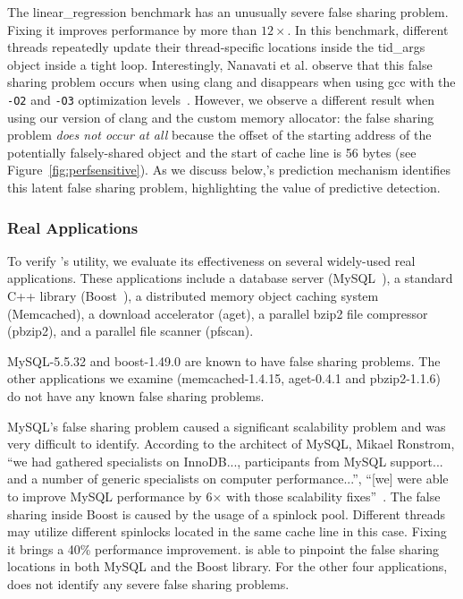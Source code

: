 The linear\_regression benchmark has an unusually severe false sharing problem. Fixing it improves performance by more than $12\times$. In this benchmark, different threads repeatedly update their thread-specific locations inside the tid\_args object inside a tight loop. Interestingly, Nanavati et al. observe that this false sharing problem occurs when using clang and disappears when using gcc with the \texttt{-O2} and \texttt{-O3} optimization levels~\cite{OSdetection}. However, we observe a different result when using our version of clang and the custom memory allocator: the false sharing problem \emph{does not occur at all} because the offset of the starting address of the potentially falsely-shared object and the start of cache line is 56 bytes (see Figure~\ref{fig:perfsensitive}). As we discuss below,\Predator{}'s prediction mechanism identifies this latent false sharing problem, highlighting the value of predictive detection.

\subsubsection{Real Applications}
To verify \Predator{}'s utility, we evaluate its effectiveness on several widely-used real applications. These applications include a database server (MySQL~\cite{mysql}),
a standard C++ library (Boost~\cite{libfalsesharing}),
a distributed memory object caching system (Memcached), a download accelerator (aget),
a parallel bzip2 file compressor (pbzip2), and a parallel file scanner (pfscan).

MySQL-5.5.32 and boost-1.49.0 are known to have false sharing problems. The other applications we examine (memcached-1.4.15, aget-0.4.1 and pbzip2-1.1.6) do not have  any known false sharing problems.

MySQL's false sharing problem caused a significant scalability problem and was very difficult to identify.
According to the architect of MySQL, Mikael Ronstrom, ``we had gathered specialists on InnoDB..., participants from MySQL support... and a number of generic specialists on 
computer performance...'', ``[we] were able to improve MySQL performance by 6$\times$ with those scalability fixes''~\cite{mysql}. 
The false sharing inside Boost is caused by the usage of a spinlock pool. Different threads may utilize different spinlocks located in the same cache line in this case. Fixing it brings a 40\% performance improvement.
\Predator{} is able to pinpoint the false sharing locations in both MySQL and the Boost library. 
For the other four applications, \Predator{} does not identify any severe false sharing problems.

